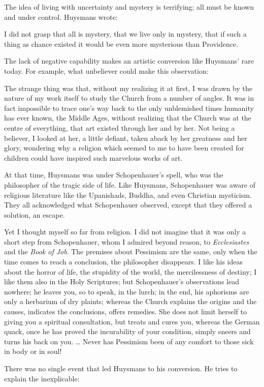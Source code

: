 The idea of living with uncertainty and mystery is terrifying; all must be known and under control. Huysmans wrote:

\begin{quotex}
I did not grasp that all is mystery, that we live only in mystery, that if such a thing as chance existed it would be even more mysterious than Providence. 

\end{quotex}
The lack of negative capability makes an artistic conversion like Huysmans' rare today. For example, what unbeliever could make this observation:

\begin{quotex}
The strange thing was that, without my realizing it at first, I was drawn by the nature of my work itself to study the Church from a number of angles. It was in fact impossible to trace one's way back to the only unblemished times humanity has ever known, the Middle Ages, without realizing that the Church was at the centre of everything, that art existed through her and by her. Not being a believer, I looked at her, a little defiant, taken aback by her greatness and her glory, wondering why a religion which seemed to me to have been created for children could have inspired such marvelous works of art. 

\end{quotex}
At that time, Huysmans was under Schopenhauer's spell, who was the philosopher of the tragic side of life. Like Huysmans, Schopenhauer was aware of religious literature like the Upanishads, Buddha, and even Christian mysticism. They all acknowledged what Schopenhauer observed, except that they offered a solution, an escape.

\begin{quotex}
Yet I thought myself so far from religion. I did not imagine that it was only a short step from Schopenhauer, whom I admired beyond reason, to \emph{Ecclesiastes} and the \emph{Book of Job}. The premises about Pessimism are the same, only when the time comes to reach a conclusion, the philosopher disappears. I like his ideas about the horror of life, the stupidity of the world, the mercilessness of destiny; I like them also in the Holy Scriptures; but Schopenhauer's observations lead nowhere; he leaves you, so to speak, in the lurch; in the end, his aphorisms are only a herbarium of dry plaints; whereas the Church explains the origins and the causes, indicates the conclusions, offers remedies. She does not limit herself to giving you a spiritual consultation, but treats and cures you, whereas the German quack, once he has proved the incurability of your condition, simply sneers and turns his back on you. … Never has Pessimism been of any comfort to those sick in body or in soul! 

\end{quotex}
There was no single event that led Huysmans to his conversion. He tries to explain the inexplicable:

